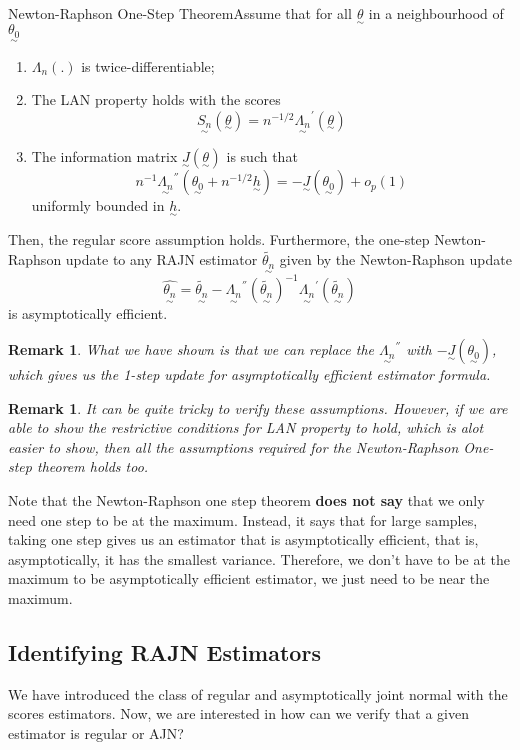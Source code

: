 \documentclass[twoside]{article}
\newtheorem{remark}[theorem]{Remark}
\newcommand{\utilde}{\underset{\sim}}
\begin{document}
\begin{theorem_exam}{Newton-Raphson One-Step Theorem}{}Assume that for all $\utilde{\theta}$ in a neighbourhood of $\utilde{\theta_0}$
\begin{enumerate}
\item $\Lambda_n(.)$ is twice-differentiable;
\item The LAN property holds with the scores 
$$
\utilde{S_n}(\utilde{\theta}) = n^{-1/2}\utilde{\Lambda_n}^{'}(\utilde{\theta})
$$
\item The information matrix $\utilde{J}(\utilde{\theta})$ is such that 
$$
n^{-1}\utilde{\Lambda_n}^{''}(\utilde{\theta_0} + n^{-1/2}\utilde{h}) = -\utilde{J}(\utilde{\theta_0}) + o_p(1)
$$
uniformly bounded in $\utilde{h}.$
\end{enumerate}
Then, the regular score assumption holds. Furthermore, the one-step Newton-Raphson update to any RAJN estimator $\tilde{\utilde{\theta_n}}$ given by the Newton-Raphson update 
$$
\hat{\utilde{\theta_n}} = \tilde{\utilde{\theta_n}} - \utilde{\Lambda_n}^{''}(\tilde{\utilde{\theta_n}})^{-1}\utilde{\Lambda_n}^{'}(\tilde{\utilde{\theta_n}})
$$
is asymptotically efficient.
\end{theorem_exam}
\begin{remark}
What we have shown is that we can replace the $ \utilde{\Lambda_n}^{''}$ with $-\utilde{J}(\utilde{\theta_{0}})$, which gives us the 1-step update for asymptotically efficient estimator formula.
\end{remark}

\begin{remark}It can be quite tricky to verify these assumptions. However, if we are able to show the restrictive conditions for LAN property to hold, which is alot easier to show, then all the assumptions required for the Newton-Raphson One-step theorem holds too.
\end{remark}

Note that the Newton-Raphson one step theorem \textbf{does not say} that we only need one step to be at the maximum. Instead, it says that for large samples, taking one step gives us an estimator that is asymptotically efficient, that is, asymptotically, it has the smallest variance. Therefore, we don't have to be at the maximum to be asymptotically efficient estimator, we just need to be near the maximum.


\subsection{Identifying RAJN Estimators}
We have introduced the class of regular and asymptotically joint normal with the scores estimators. Now, we are interested in how can we verify that a given estimator is regular or AJN?
\end{document}
